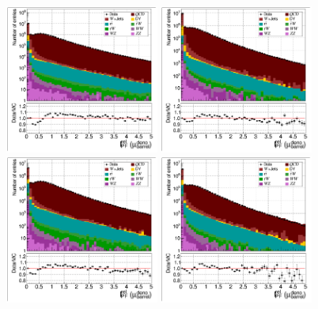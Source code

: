 \documentclass[a4paper, 12pt, oneside]{article}
\begin{document}
\begin{figure}[H]
	\includegraphics[width=0.45\textwidth]{Kursinis3/TFit_DB_50to70.png}
	\includegraphics[width=0.45\textwidth]{Kursinis3/TFit_DE_50to70.png}
	\includegraphics[width=0.45\textwidth]{Kursinis3/TFit_DB_70to100.png}
	\includegraphics[width=0.45\textwidth]{Kursinis3/TFit_DE_70to100.png}

\end{figure}
\end{document}
